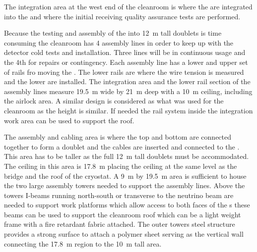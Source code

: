The  integration area at the west end of the cleanroom is where the  are integrated into the  and where the initial receiving quality assurance tests are performed. 

Because the testing and assembly of the  into \SI{12}{m} tall doublets is time consuming the cleanroom has 4 assembly lines in order to keep up with the detector cold tests and installation. 
Three lines will be in continuous usage and the 4th for repairs or contingency. 
Each assembly line has a lower and upper set of rails fro moving the .
The lower rails are where the wire tension is measured and the lower   are installed. The  integration area and the lower rail section of the assembly lines measure \SI{19.5}{m} wide by \SI{21}{m} deep with a \SI{10}{m} ceiling, including the airlock area. 
A similar design is considered as what was used for the  cleanroom as the height is similar. 
If needed the rail system inside the integration work area can be used to support the roof.
 
The  assembly and cabling area is where the top and bottom  are connected together to form a doublet and the  cables are inserted and connected to the . 
This area has to be taller as the full \SI{12}{m} tall  doublets must be accommodated. 
The ceiling in this area is \SI{17.8}{m} placing the ceiling at the same level as the bridge and the roof of the cryostat. 
A \SI{9}{m} by \SI{19.5}{m} area is sufficient to house the two large assembly towers needed to support the assembly lines. Above the towers I-beams running north-south or transverse to the neutrino beam are needed to support work platforms which allow access to both faces of the s these beams can be used to support the cleanroom roof which can be a light weight frame with a fire retardant fabric attached. 
The outer towers steel structure provides a strong surface to attach a polymer sheet serving as the vertical wall connecting the \SI{17.8}{m} region to the \SI{10}{m} tall area.

